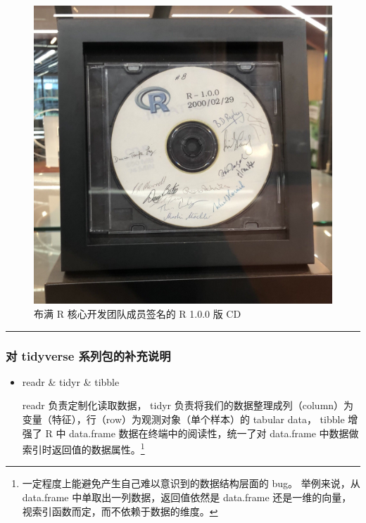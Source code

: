 \documentclass[11pt,hyperref]{ctexart}
\begin{document}
\begin{figure}
\centering
\includegraphics{images/A-CD-ROM-of-the-original-version-of-R-signed-by-the-R-Core-Team.jpg}
\caption{布满 R 核心开发团队成员签名的 R 1.0.0 版 CD}
\end{figure}

\begin{center}\rule{0.5\linewidth}{0.5pt}\end{center}

\hypertarget{ux5bf9-tidyverse-ux7cfbux5217ux5305ux7684ux8865ux5145ux8bf4ux660e}{%
\subsubsection{对 tidyverse
系列包的补充说明}\label{ux5bf9-tidyverse-ux7cfbux5217ux5305ux7684ux8865ux5145ux8bf4ux660e}}

\begin{itemize}
\item
  readr \& tidyr \& tibble

  readr 负责定制化读取数据， tidyr
  负责将我们的数据整理成列（column）为变量（特征），行（row）为观测对象（单个样本）的
  tabular data， tibble 增强了 R 中 data.frame
  数据在终端中的阅读性，统一了对 data.frame
  中数据做索引时返回值的数据属性。\footnote{一定程度上能避免产生自己难以意识到的数据结构层面的
    bug。 举例来说，从 data.frame 中单取出一列数据，返回值依然是
    data.frame 还是一维的向量，视索引函数而定，而不依赖于数据的维度。}
\end{itemize}
\end{document}
